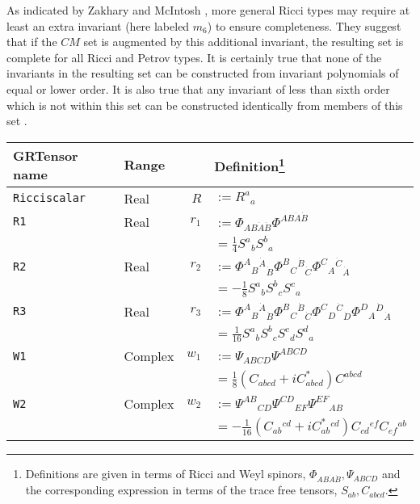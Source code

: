 \documentclass{article}
\begin{document}
{{{As indicated by Zakhary and McIntosh \cite{zakhary/mcintosh:1996}, more
general Ricci types may require at least an extra invariant (here
labeled $m_6$) to ensure completeness. They suggest that if the $CM$
set is augmented by this additional invariant, the resulting set is
complete for all Ricci and Petrov types. It is certainly true that
none of the invariants in the resulting set can be constructed from
invariant polynomials of equal or lower order. It is also true that
any invariant of less than sixth order which is not within this set
can be constructed identically from members of this set
\cite{pollney:1996}.\\

\pagebreak
\renewcommand{\baselinestretch}{1.5}\normalsize
\begin{longtable}[c]{llrp{}}\hline\hline
GRTensor name	& Range	& &Definition\footnote{
			   Definitions are given
			   in terms of Ricci and Weyl spinors,
			   $\Phi_{AB\dot{A}\dot{B}}, \Psi_{ABCD}$ 
			   and the corresponding
			   expression in terms of the trace free tensors,
			   $S_{ab}, C_{abcd}$.} \\  \hline
%
\texttt{Ricciscalar} & Real & $R$ & $:= R^a{}_a$ \\
\texttt{R1}	& Real	& $r_1$ & $:= \Phi_{AB\dot{A}\dot{B}} 
				  \Phi^{AB\dot{A}\dot{B}}$\\
		&	&	& $= \frac{1}{4} S^a{}_b S^b{}_a$ \\
\texttt{R2}	& Real	& $r_2$ & $:= \Phi^A{}_B{}^{\dot{A}}{}_{\dot{B}}
				  \Phi^B{}_C{}^{\dot{B}}{}_{\dot{C}}
				  \Phi^C{}_A{}^{\dot{C}}{}_{\dot{A}} $\\
		&	& 	& $= -\frac{1}{8} S^a{}_b S^b{}_c S^c{}_a$ \\
\texttt{R3}	& Real	& $r_3$	& $:= \Phi^A{}_B{}^{\dot{A}}{}_{\dot{B}}
				  \Phi^B{}_C{}^{\dot{B}}{}_{\dot{C}}
				  \Phi^C{}_D{}^{\dot{C}}{}_{\dot{D}}
				  \Phi^D{}_A{}^{\dot{D}}{}_{\dot{A}}$\\
		&	&	& $= \frac{1}{16} S^a{}_b S^b{}_c S^c{}_d 
				  S^d{}_a$ \\
\texttt{W1}	& Complex & $w_1$ & $:= \Psi_{ABCD}\Psi^{ABCD}$\\
		&	&	& $ = \frac{1}{8} ( C_{abcd}
				  + i C^*_{abcd} ) C^{abcd}$ \\
\texttt{W2}	& Complex & $w_2$ & $:= \Psi^{AB}{}_{CD}\Psi^{CD}{}_{EF}
				  \Psi^{EF}{}_{AB}$\\
		&	&	& $= -\frac{1}{16} ( C_{ab}{}^{cd}
				  + i C^*_{ab}{}^{cd} ) C_{cd}{}^{ef}
				  C_{ef}{}^{ab}$\\

\end{longtable}}}}
\end{document}
